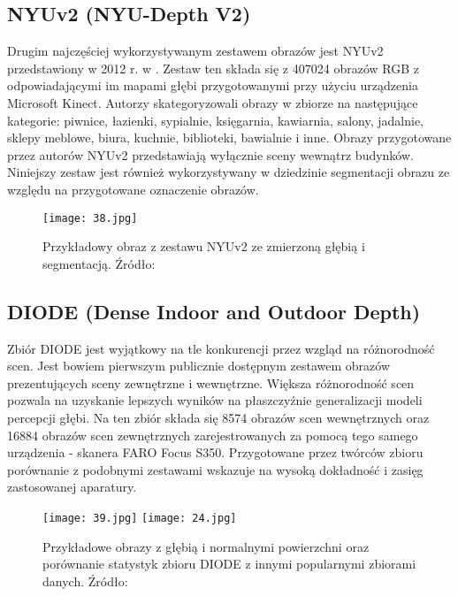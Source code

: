 \subsection{NYUv2 (NYU-Depth V2)}
Drugim najczęściej wykorzystywanym zestawem obrazów jest NYUv2 przedstawiony w 2012 r. w \cite{couprie2013}. Zestaw ten składa się z 407024 obrazów RGB z odpowiadającymi im mapami głębi przygotowanymi przy użyciu urządzenia Microsoft Kinect. Autorzy skategoryzowali obrazy w zbiorze na następujące kategorie: piwnice, łazienki, sypialnie, księgarnia, kawiarnia, salony, jadalnie, sklepy meblowe, biura, kuchnie, biblioteki, bawialnie i inne. Obrazy przygotowane przez autorów NYUv2 przedstawiają wyłącznie sceny wewnątrz budynków. Niniejszy zestaw jest również wykorzystywany w dziedzinie segmentacji obrazu ze względu na przygotowane oznaczenie obrazów.
\begin{figure}[H]
    \centering
    \texttt{[image: 38.jpg]}
    \caption{Przykładowy obraz z zestawu NYUv2 ze zmierzoną głębią i segmentacją. Źródło: \cite{couprie2013}}
    \label{fig:nyuv2-example}
\end{figure}

\subsection{DIODE (Dense Indoor and Outdoor Depth)}
Zbiór DIODE \cite{vasiljevic2019} jest wyjątkowy na tle konkurencji przez wzgląd na różnorodność scen. Jest bowiem pierwszym publicznie dostępnym zestawem obrazów prezentujących sceny zewnętrzne i wewnętrzne. Większa różnorodność scen pozwala na uzyskanie lepszych wyników na płaszczyźnie generalizacji modeli percepcji głębi. Na ten zbiór składa się 8574 obrazów scen wewnętrznych oraz 16884 obrazów scen zewnętrznych zarejestrowanych za pomocą tego samego urządzenia - skanera FARO Focus S350. Przygotowane przez twórców zbioru porównanie z podobnymi zestawami wskazuje na wysoką dokładność i zasięg zastosowanej aparatury.
\begin{figure}[H]
    \centering
    \texttt{[image: 39.jpg]}
    \texttt{[image: 24.jpg]}
    \caption{Przykładowe obrazy z głębią i normalnymi powierzchni oraz porównanie statystyk zbioru DIODE z innymi popularnymi zbiorami danych. Źródło: \cite{vasiljevic2019}}
    \label{fig:diode-comparison}
\end{figure}

